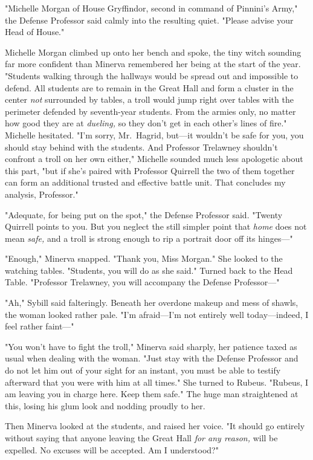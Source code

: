"Michelle Morgan of House Gryffindor, second in command of Pinnini's Army," the
Defense Professor said calmly into the resulting quiet. "Please advise your
Head of House."

Michelle Morgan climbed up onto her bench and spoke, the tiny witch sounding
far more confident than Minerva remembered her being at the start of the year.
"Students walking through the hallways would be spread out and impossible to
defend. All students are to remain in the Great Hall and form a cluster in the
center{\el} \emph{not} surrounded by tables, a troll would jump right over
tables{\el} with the perimeter defended by seventh-year students. From the
armies only, no matter how good they are at \emph{dueling,} so they don't get
in each other's lines of fire." Michelle hesitated. "I'm sorry, Mr.~Hagrid,
but—it wouldn't be safe for you, you should stay behind with the students.
And Professor Trelawney shouldn't confront a troll on her own either," Michelle
sounded much less apologetic about this part, "but if she's paired with
Professor Quirrell the two of them together can form an additional trusted and
effective battle unit. That concludes my analysis, Professor."

"Adequate, for being put on the spot," the Defense Professor said. "Twenty
Quirrell points to you. But you neglect the still simpler point that
\emph{home} does not mean \emph{safe,} and a troll is strong enough to rip a
portrait door off its hinges—"

"Enough," Minerva snapped. "Thank you, Miss Morgan." She looked to the watching
tables. "Students, you will do as she said." Turned back to the Head Table.
"Professor Trelawney, you will accompany the Defense Professor—"

"Ah," Sybill said falteringly. Beneath her overdone makeup and mess of shawls,
the woman looked rather pale. "I'm afraid—I'm not entirely well
today—indeed, I feel rather faint—"

"You won't have to fight the troll," Minerva said sharply, her patience taxed
as usual when dealing with the woman. "Just stay with the Defense Professor and
do not let him out of your sight for an instant, you must be able to testify
afterward that you were with him at all times." She turned to Rubeus.
"Rubeus, I am leaving you in charge here. Keep them safe." The huge man
straightened at this, losing his glum look and nodding proudly to her.

Then Minerva looked at the students, and raised her voice. "It should go
entirely without saying that anyone leaving the Great Hall \emph{for any
reason,} will be expelled. No excuses will be accepted. Am I understood?"

